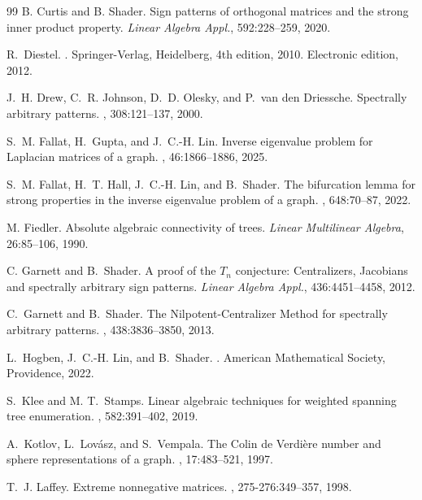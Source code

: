 \documentclass{article}
\theoremstyle{definition}
\begin{document}
\begin{thebibliography}{99}
B. Curtis and B. Shader.
\newblock Sign patterns of orthogonal matrices and the strong inner product property.
\newblock \emph{Linear Algebra Appl.}, 592:228--259, 2020. 

R.~Diestel.
.
\newblock Springer-Verlag, Heidelberg, 4th edition, 2010.
\newblock Electronic edition, 2012.

J.~H. Drew, C.~R. Johnson, D.~D. Olesky, and P.~van den Driessche.
\newblock Spectrally arbitrary patterns.
, 308:121--137, 2000.

S.~M. Fallat, H.~Gupta, and J.~C.-H. Lin.
\newblock Inverse eigenvalue problem for {L}aplacian matrices of a graph.
, 46:1866--1886, 2025.

S.~M. Fallat, H.~T. Hall, J.~C.-H. Lin, and B.~Shader.
\newblock The bifurcation lemma for strong properties in the inverse eigenvalue problem of a graph.
, 648:70--87, 2022.

M. Fiedler.
\newblock Absolute algebraic connectivity of trees.
\newblock \emph{Linear Multilinear Algebra}, 26:85--106, 1990. 

C. Garnett and B.~Shader. 
\newblock A proof of the {$T_n$} conjecture: {C}entralizers, {J}acobians and spectrally arbitrary sign patterns.
\newblock \emph{Linear Algebra Appl.}, 436:4451--4458, 2012. 

C.~Garnett and B.~Shader.
\newblock The {N}ilpotent-{C}entralizer {M}ethod for spectrally arbitrary patterns.
, 438:3836--3850, 2013.

L.~Hogben, J.~C.-H. Lin, and B.~Shader.
.
\newblock American Mathematical Society, Providence, 2022.

S.~Klee and  M. T.~Stamps.
Linear algebraic techniques for weighted spanning tree enumeration.
, 582:391--402, 2019.
  
A.~Kotlov, L.~Lov{\'a}sz, and S.~Vempala.
\newblock The {C}olin de {V}erdi\`ere number and sphere representations of a
  graph.
, 17:483--521, 1997.

T.~J. Laffey.
\newblock Extreme nonnegative matrices.
, 275-276:349--357, 1998.


\end{thebibliography}
\end{document}
